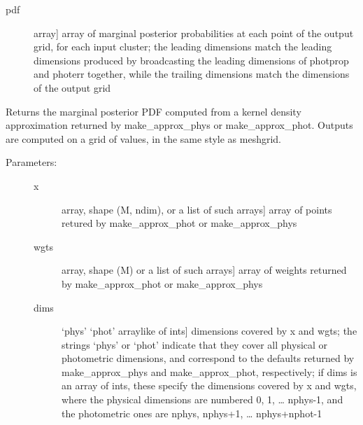 \documentclass[letterpaper,10pt,english]{sphinxmanual}
\begin{document}
\begin{fulllineitems}
\begin{fulllineitems}
\begin{description}
\begin{description}
\item[{pdf}] \leavevmode{[}array{]}
array of marginal posterior probabilities at each point
of the output grid, for each input cluster; the leading
dimensions match the leading dimensions produced by
broadcasting the leading dimensions of photprop and
photerr together, while the trailing dimensions match
the dimensions of the output grid

\end{description}

\end{description}

\end{fulllineitems}


\begin{fulllineitems}
\label{\detokenize{cluster_slug:slugpy.cluster_slug.cluster_slug.mpdf_approx}}
Returns the marginal posterior PDF computed from a kernel
density approximation returned by make\_approx\_phys or
make\_approx\_phot. Outputs are computed on a grid of values, in
the same style as meshgrid.
\begin{description}
\item[{Parameters:}] \leavevmode\begin{description}
\item[{x}] \leavevmode{[}array, shape (M, ndim), or a list of such arrays{]}
array of points retured by make\_approx\_phot or
make\_approx\_phys

\item[{wgts}] \leavevmode{[}array, shape (M) or a list of such arrays{]}
array of weights returned by make\_approx\_phot or
make\_approx\_phys

\item[{dims}] \leavevmode{[}‘phys’ \textbar{} ‘phot’ \textbar{} arraylike of ints{]}
dimensions covered by x and wgts; the strings ‘phys’ or
‘phot’ indicate that they cover all physical or
photometric dimensions, and correspond to the defaults
returned by make\_approx\_phys and make\_approx\_phot,
respectively; if dims is an array of ints, these specify
the dimensions covered by x and wgts, where the
physical dimensions are numbered 0, 1, … nphys-1, and
the photometric ones are nphys, nphys+1,
… nphys+nphot-1


\end{description}
\end{description}
\end{fulllineitems}
\end{fulllineitems}
\end{document}
